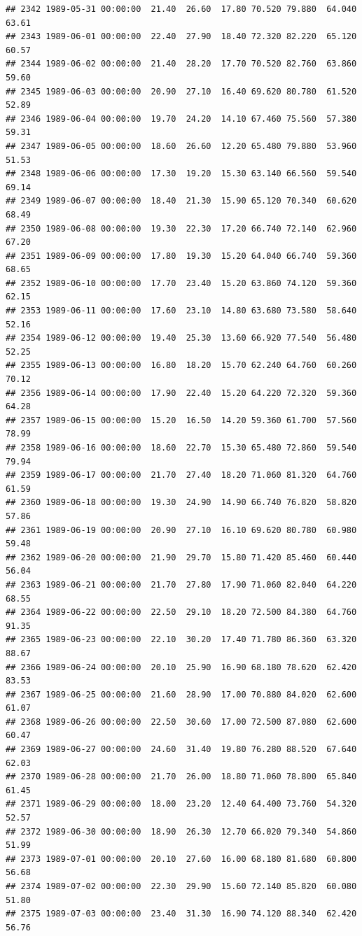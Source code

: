 \documentclass{article}\usepackage{graphicx, color}
\makeatletter
\newenvironment{kframe}{%
 \def\at@end@of@kframe{}%
 \ifinner\ifhmode%
  \def\at@end@of@kframe{\end{minipage}}%
  \begin{minipage}{\columnwidth}%
 \fi\fi%
 \def\FrameCommand##1{\hskip\@totalleftmargin \hskip-\fboxsep
 \colorbox{shadecolor}{##1}\hskip-\fboxsep
     \hskip-\linewidth \hskip-\@totalleftmargin \hskip\columnwidth}%
 \MakeFramed {\advance\hsize-\width
   \@totalleftmargin\z@ \linewidth\hsize
   \@setminipage}}%
 {\par\unskip\endMakeFramed%
 \at@end@of@kframe}
\newenvironment{knitrout}{}{} %
\makeatother
\begin{document}
\begin{knitrout}
\begin{kframe}
\begin{verbatim}
## 2342 1989-05-31 00:00:00  21.40  26.60  17.80 70.520 79.880  64.040  63.61
## 2343 1989-06-01 00:00:00  22.40  27.90  18.40 72.320 82.220  65.120  60.57
## 2344 1989-06-02 00:00:00  21.40  28.20  17.70 70.520 82.760  63.860  59.60
## 2345 1989-06-03 00:00:00  20.90  27.10  16.40 69.620 80.780  61.520  52.89
## 2346 1989-06-04 00:00:00  19.70  24.20  14.10 67.460 75.560  57.380  59.31
## 2347 1989-06-05 00:00:00  18.60  26.60  12.20 65.480 79.880  53.960  51.53
## 2348 1989-06-06 00:00:00  17.30  19.20  15.30 63.140 66.560  59.540  69.14
## 2349 1989-06-07 00:00:00  18.40  21.30  15.90 65.120 70.340  60.620  68.49
## 2350 1989-06-08 00:00:00  19.30  22.30  17.20 66.740 72.140  62.960  67.20
## 2351 1989-06-09 00:00:00  17.80  19.30  15.20 64.040 66.740  59.360  68.65
## 2352 1989-06-10 00:00:00  17.70  23.40  15.20 63.860 74.120  59.360  62.15
## 2353 1989-06-11 00:00:00  17.60  23.10  14.80 63.680 73.580  58.640  52.16
## 2354 1989-06-12 00:00:00  19.40  25.30  13.60 66.920 77.540  56.480  52.25
## 2355 1989-06-13 00:00:00  16.80  18.20  15.70 62.240 64.760  60.260  70.12
## 2356 1989-06-14 00:00:00  17.90  22.40  15.20 64.220 72.320  59.360  64.28
## 2357 1989-06-15 00:00:00  15.20  16.50  14.20 59.360 61.700  57.560  78.99
## 2358 1989-06-16 00:00:00  18.60  22.70  15.30 65.480 72.860  59.540  79.94
## 2359 1989-06-17 00:00:00  21.70  27.40  18.20 71.060 81.320  64.760  61.59
## 2360 1989-06-18 00:00:00  19.30  24.90  14.90 66.740 76.820  58.820  57.86
## 2361 1989-06-19 00:00:00  20.90  27.10  16.10 69.620 80.780  60.980  59.48
## 2362 1989-06-20 00:00:00  21.90  29.70  15.80 71.420 85.460  60.440  56.04
## 2363 1989-06-21 00:00:00  21.70  27.80  17.90 71.060 82.040  64.220  68.55
## 2364 1989-06-22 00:00:00  22.50  29.10  18.20 72.500 84.380  64.760  91.35
## 2365 1989-06-23 00:00:00  22.10  30.20  17.40 71.780 86.360  63.320  88.67
## 2366 1989-06-24 00:00:00  20.10  25.90  16.90 68.180 78.620  62.420  83.53
## 2367 1989-06-25 00:00:00  21.60  28.90  17.00 70.880 84.020  62.600  61.07
## 2368 1989-06-26 00:00:00  22.50  30.60  17.00 72.500 87.080  62.600  60.47
## 2369 1989-06-27 00:00:00  24.60  31.40  19.80 76.280 88.520  67.640  62.03
## 2370 1989-06-28 00:00:00  21.70  26.00  18.80 71.060 78.800  65.840  61.45
## 2371 1989-06-29 00:00:00  18.00  23.20  12.40 64.400 73.760  54.320  52.57
## 2372 1989-06-30 00:00:00  18.90  26.30  12.70 66.020 79.340  54.860  51.99
## 2373 1989-07-01 00:00:00  20.10  27.60  16.00 68.180 81.680  60.800  56.68
## 2374 1989-07-02 00:00:00  22.30  29.90  15.60 72.140 85.820  60.080  51.80
## 2375 1989-07-03 00:00:00  23.40  31.30  16.90 74.120 88.340  62.420  56.76

\end{verbatim}
\end{kframe}
\end{knitrout}
\end{document}
